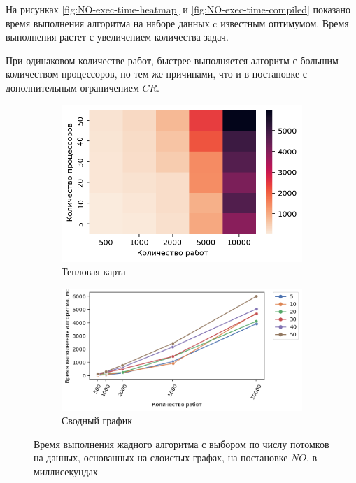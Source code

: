 На рисунках \ref{fig:NO-exec-time-heatmap} и \ref{fig:NO-exec-time-compiled} показано время выполнения алгоритма на наборе данных c известным оптимумом. Время выполнения растет с увеличением количества задач. 

При одинаковом количестве работ, быстрее выполняется алгоритм с большим количеством процессоров, по тем же причинами, что и в постановке с дополнительным ограничением $CR$. 

\begin{figure}[!htbp]
    \centering
    \begin{subfigure}{0.49\textwidth}
        \includegraphics[width=\textwidth]{imgs/layered_class_1/NO/et_heatmap.png}
        \caption{Тепловая карта}
        \label{fig:NO-layered-exec-time-heatmap}
    \end{subfigure}
    \hfill
    \begin{subfigure}{0.49\textwidth}
        \includegraphics[width=\textwidth]{imgs/layered_class_1/NO/tr_graph.png}
        \caption{Сводный график}
        \label{fig:NO-layered-exec-time-compiled}
    \end{subfigure}
    \caption{Время выполнения жадного алгоритма с выбором по числу потомков на данных, основанных на слоистых графах, на постановке $NO$, в миллисекундах}
\end{figure}

